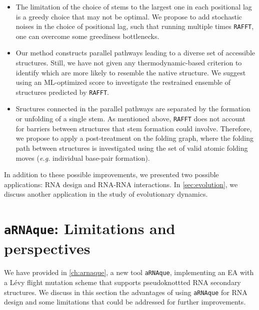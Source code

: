 \begin{itemize}
	\item The limitation of the choice of stems to the largest one in each positional lag is a greedy choice that may not be optimal. We propose to add stochastic noises in the choice of positional lag, such that running multiple times \texttt{RAFFT}, one can overcome some greediness bottlenecks.
	
	\item Our method constructs parallel pathways leading to a diverse set of
	accessible structures. Still, we have not given any thermodynamic-based criterion to identify which are more likely to resemble the native structure. We suggest using an \ac{ML}-optimized score to investigate the restrained ensemble of structures predicted by \texttt{RAFFT}.
	\item Sructures connected in the parallel pathways are separated by the
	formation or unfolding of a single stem. As mentioned above, \texttt{RAFFT} does not account for barriers between structures that stem formation could involve. Therefore, we propose to apply a post-treatment on the folding graph, where the folding path between structures is investigated using the set of valid atomic folding moves (\textit{e.g.} individual base-pair formation).
\end{itemize}

In addition to these possible improvements, we presented two possible applications: \ac{RNA} design and \ac{RNA}-\ac{RNA} interactions. In \autoref{sec:evolution}, we discuss another application in the study of evolutionary dynamics.
\section{\texttt{aRNAque}: Limitations and perspectives}
We have provided in \autoref{ch:arnaque}, a new tool \texttt{aRNAque},  implementing an \ac{EA} with a Lévy flight mutation scheme that supports pseudoknottted \ac{RNA} secondary structures. We discuss in this section the advantages of using \texttt{aRNAque} for \ac{RNA} design and some limitations that could be addressed for further improvements.

